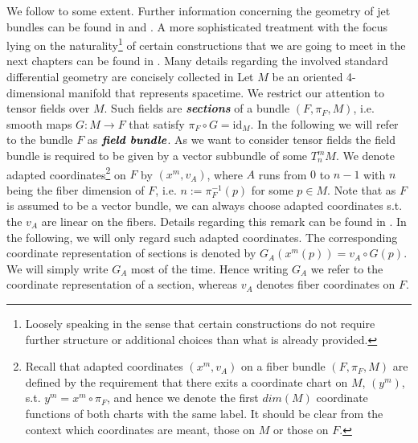 \documentclass[a4paper,12pt, DIV=14, BCOR=5mm, twoside, headsepline, numbers=noenddot]{scrbook}
\begin{document}
We follow \cite{1998physics...1019G} to some extent. Further information concerning the geometry of jet bundles can be found in \cite{saunders_1989} and \cite{seiler2009involution}. A more sophisticated treatment with the focus lying on the naturality\footnote{Loosely speaking in the sense that certain constructions do not require further structure or additional choices than what is already provided.} of certain constructions that we are going to meet in the next chapters can be found in \cite{kolar1993natural}. Many details regarding the involved standard differential geometry are concisely collected in \cite{doi:10.1142/3867}  Let $M$ be an oriented 4-dimensional manifold that represents spacetime. We restrict our attention to tensor fields over $M$. Such fields are \textit{\textbf{sections}} of a bundle $(F,\pi_F,M)$, i.e. smooth maps $G : M \rightarrow F $ that satisfy $\pi_F \circ G = \mathrm{id}_M$. In the following we will refer to the bundle $F$ as $\textit{\textbf{field bundle}}$.  As we want to consider tensor fields the field bundle is required to be given by a vector subbundle of some $T^m_n M$. We denote adapted coordinates\footnote{Recall that adapted coordinates $(x^m,v_A)$ on a fiber bundle $(F, \pi_F, M)$ are defined by the requirement that there exits a coordinate chart on $M$, $(y^m)$, s.t. $y^m = x^m \circ \pi_F$, and hence we denote the first $dim(M)$ coordinate functions of both charts with the same label. It should be clear from the context which coordinates are meant, those on $M$ or those on $F$.} on $F$ by $(x^m,v_A)$, where $A$ runs from $0$ to $n - 1$ with $n$ being the fiber dimension of $F$, i.e. $n := \pi_F^{-1}(p)$ for some $p \in M$. Note that as $F$ is assumed to be a vector bundle, we can always choose adapted coordinates s.t. the $v_A$ are linear on the fibers. Details regarding this remark can be found in \cite{saunders_1989}. In the following, we will only regard such adapted coordinates. The corresponding coordinate representation of sections is denoted by $G_A(x^m(p)) = v_A \circ G (p)$. We will simply write $G_A$ most of the time. Hence writing $G_A$ we refer to the coordinate representation of a section, whereas $v_A$ denotes fiber coordinates on $F$.
\end{document}
